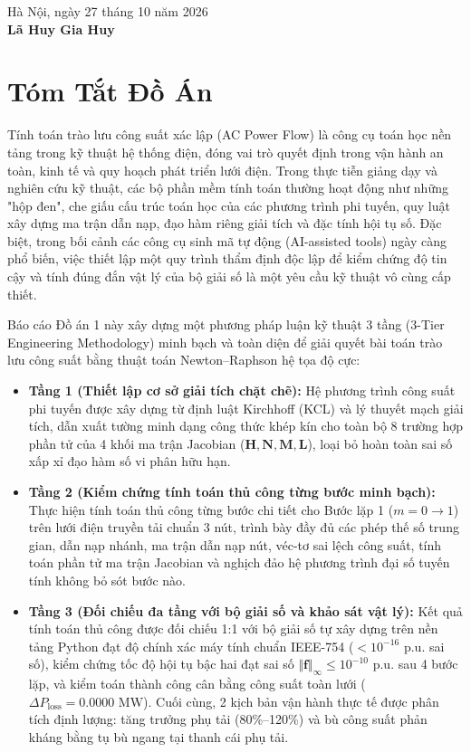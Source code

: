 \documentclass[12pt,a4paper,oneside]{report}
\begin{document}
\vspace{45pt}
\begin{flushright}
    Hà Nội, ngày 27 tháng 10 năm 2026\\[12pt]
    \textbf{Lã Huy Gia Huy}
\end{flushright}

\clearpage

\chapter*{Tóm Tắt Đồ Án}

Tính toán trào lưu công suất xác lập (AC Power Flow) là công cụ toán học nền tảng trong kỹ thuật hệ thống điện, đóng vai trò quyết định trong vận hành an toàn, kinh tế và quy hoạch phát triển lưới điện. Trong thực tiễn giảng dạy và nghiên cứu kỹ thuật, các bộ phần mềm tính toán thường hoạt động như những "hộp đen", che giấu cấu trúc toán học của các phương trình phi tuyến, quy luật xây dựng ma trận dẫn nạp, đạo hàm riêng giải tích và đặc tính hội tụ số. Đặc biệt, trong bối cảnh các công cụ sinh mã tự động (AI-assisted tools) ngày càng phổ biến, việc thiết lập một quy trình thẩm định độc lập để kiểm chứng độ tin cậy và tính đúng đắn vật lý của bộ giải số là một yêu cầu kỹ thuật vô cùng cấp thiết.

Báo cáo Đồ án 1 này xây dựng một phương pháp luận kỹ thuật 3 tầng (3-Tier Engineering Methodology) minh bạch và toàn diện để giải quyết bài toán trào lưu công suất bằng thuật toán Newton--Raphson hệ tọa độ cực:
\begin{itemize}
    \item \textbf{Tầng 1 (Thiết lập cơ sở giải tích chặt chẽ):} Hệ phương trình công suất phi tuyến được xây dựng từ định luật Kirchhoff (KCL) và lý thuyết mạch giải tích, dẫn xuất tường minh dạng công thức khép kín cho toàn bộ 8 trường hợp phần tử của 4 khối ma trận Jacobian ($\mathbf{H}, \mathbf{N}, \mathbf{M}, \mathbf{L}$), loại bỏ hoàn toàn sai số xấp xỉ đạo hàm số vi phân hữu hạn.
    \item \textbf{Tầng 2 (Kiểm chứng tính toán thủ công từng bước minh bạch):} Thực hiện tính toán thủ công từng bước chi tiết cho Bước lặp 1 ($m = 0 \to 1$) trên lưới điện truyền tải chuẩn 3 nút, trình bày đầy đủ các phép thế số trung gian, dẫn nạp nhánh, ma trận dẫn nạp nút, véc-tơ sai lệch công suất, tính toán phần tử ma trận Jacobian và nghịch đảo hệ phương trình đại số tuyến tính không bỏ sót bước nào.
    \item \textbf{Tầng 3 (Đối chiếu đa tầng với bộ giải số và khảo sát vật lý):} Kết quả tính toán thủ công được đối chiếu 1:1 với bộ giải số tự xây dựng trên nền tảng Python đạt độ chính xác máy tính chuẩn IEEE-754 ($< 10^{-16}\text{ p.u.}$ sai số), kiểm chứng tốc độ hội tụ bậc hai đạt sai số $\Vert \mathbf{f} \Vert_\infty \le 10^{-10}\text{ p.u.}$ sau 4 bước lặp, và kiểm toán thành công cân bằng công suất toàn lưới ($\Delta P_{\text{loss}} = 0.0000\text{ MW}$). Cuối cùng, 2 kịch bản vận hành thực tế được phân tích định lượng: tăng trưởng phụ tải (80\%--120\%) và bù công suất phản kháng bằng tụ bù ngang tại thanh cái phụ tải.
\end{itemize}
\end{document}
